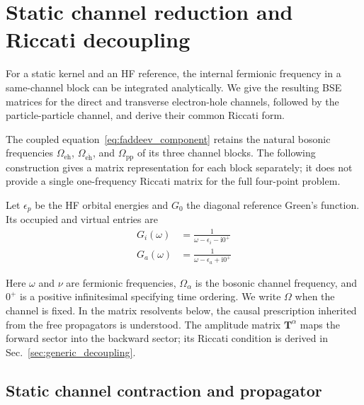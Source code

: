 \documentclass[aip,jcp,reprint,noshowkeys,superscriptaddress]{revtex4-1}
\newcommand{\eh}{\text{eh}}
\newcommand{\teh}{{\overline{\text{eh}}}}
\newcommand{\pp}{\text{pp}}
\newcommand{\ii}{\mathrm{i}}
\newcommand{\bT}{\boldsymbol{T}}
\begin{document}
\section{Static channel reduction and Riccati decoupling}
\label{sec:multifrequency_static}

For a static kernel and an HF reference, the internal fermionic frequency
in a same-channel block can be integrated analytically. We give the resulting
BSE matrices for the direct and transverse electron-hole channels, followed
by the particle-particle channel, and derive their common Riccati form.

The coupled equation~\eqref{eq:faddeev_component} retains the natural
bosonic frequencies $\Omega_{\eh}$, $\Omega_{\teh}$, and $\Omega_{\pp}$
of its three channel blocks. The following construction gives a matrix
representation for each block separately; it does not provide a single
one-frequency Riccati matrix for the full four-point problem.

Let $\epsilon_p$ be the HF orbital energies and $G_0$ the diagonal
reference Green's function. Its occupied and virtual entries are
\begin{align}
    G_i(\omega)
    &=
    \frac{1}{\omega-\epsilon_i-\ii 0^+}
    \\
    G_a(\omega)
    &=
    \frac{1}{\omega-\epsilon_a+\ii 0^+}
    \label{eq:HF_G_static_reduction}
\end{align}

Here $\omega$ and $\nu$ are fermionic frequencies, $\Omega_{\alpha}$ is the
bosonic channel frequency, and $0^+$ is a positive infinitesimal specifying
time ordering. We write $\Omega$ when the channel is fixed. In the matrix
resolvents below, the causal prescription inherited from the free propagators
is understood. The amplitude matrix $\bT^{\alpha}$ maps the forward sector into the
backward sector; its Riccati condition is derived in
Sec.~\ref{sec:generic_decoupling}.

\subsection{Static channel contraction and propagator}
\label{sec:static_contraction}
\end{document}
